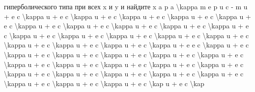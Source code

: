 \documentclass[
]{article}
\begin{document}
гиперболического типа при всех x и y и найдите x a p a
\textbackslash kappa m e p u c - m u + e c \textbackslash kappa u + e c
\textbackslash kappa u + e c \textbackslash kappa u + e c
\textbackslash kappa u + e c \textbackslash kappa u + e c
\textbackslash kappa u + e c \textbackslash kappa u + e c
\textbackslash kappa u + e c \textbackslash kappa u + e c
\textbackslash kappa u + e c \textbackslash kappa u + e c
\textbackslash kappa u + e c \textbackslash kappa u + e c
\textbackslash kappa u + e c \textbackslash kappa u + e c
\textbackslash kappa u + e c \textbackslash kappa u + e c
\textbackslash kappa u + e c \textbackslash kappa u + e e c
\textbackslash kappa u + e c \textbackslash kappa u + e c
\textbackslash kappa u + e c \textbackslash kappa u + e c
\textbackslash kappa u + e c \textbackslash kappa u + e c
\textbackslash kappa u + e c \textbackslash kappa u + e c
\textbackslash kappa u + e c \textbackslash kappa u + e c
\textbackslash kappa u + e c \textbackslash kappa u + e c
\textbackslash kappa u + e c \textbackslash kappa u + e c
\textbackslash kappa u + e c \textbackslash kappa u + e c
\textbackslash kappa u + e c \textbackslash kappa u + e c
\textbackslash kappa u + e c \textbackslash kap u + e c
\textbackslash kap
\end{document}

